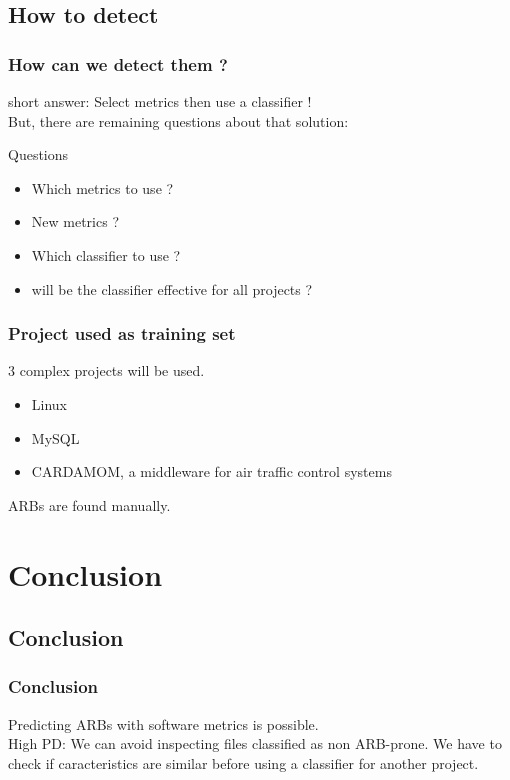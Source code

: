 \documentclass{beamer}
\begin{document}
\subsection{How to detect}
\begin{frame}
 \frametitle{How can we detect them ?}
 short answer: \alert{Select metrics then use a classifier !}\\
 But, there are remaining questions about that solution:\\
 \begin{block}{Questions}
  \begin{itemize}
   \item Which metrics to use ?
   \item New metrics ?
   \item Which classifier to use ?
   \item will be the classifier effective for all projects ?
  \end{itemize}
 \end{block}
\end{frame}

\begin{frame}
 \frametitle{Project used as training set}
 3 complex projects will be used.\\
 \begin{itemize}
  \item Linux
  \item MySQL
  \item CARDAMOM, a middleware for air traffic control systems
 \end{itemize}
 \vspace{0.2cm}
 ARBs are found manually.\\
\end{frame}









\section{Conclusion}
\subsection{Conclusion}
\begin{frame}
 \frametitle{Conclusion}
 Predicting ARBs with software metrics is possible.\\
 \vspace{1cm}
 High PD: We can avoid inspecting files classified as non ARB-prone.
 \vspace{1cm}
 We have to check if caracteristics are similar before using a classifier for another project.
\end{frame}
\end{document}
